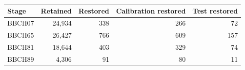 \begin{tabular}{lrrrr}
\toprule
Stage & Retained & Restored & Calibration restored & Test restored \\
\midrule
BBCH07 & 24,934 & 338 & 266 & 72 \\
BBCH65 & 26,427 & 766 & 609 & 157 \\
BBCH81 & 18,644 & 403 & 329 & 74 \\
BBCH89 & 4,306 & 91 & 80 & 11 \\
\bottomrule
\end{tabular}

